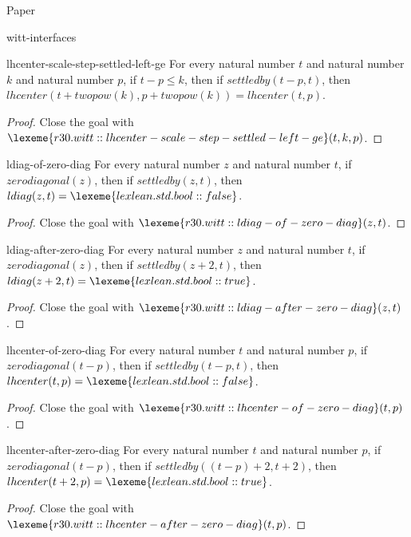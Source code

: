 \begin{lexlean}{Paper}
\begin{section}{witt-interfaces}
  \begin{theorem}{lhcenter-scale-step-settled-left-ge}
  For every natural number \(t\) and natural number \(k\) and natural number \(p\), if \(t - p ≤ k\), then if \(settledby(t - p, t)\), then \(lhcenter(t + twopow(k), p + twopow(k)) = lhcenter(t, p)\).
  \begin{proof}
  Close the goal with \(\lexeme{r30.witt::lhcenter-scale-step-settled-left-ge}(t, k, p)\).
  \end{proof}
  \end{theorem}

  \begin{theorem}{ldiag-of-zero-diag}
  For every natural number \(z\) and natural number \(t\), if \(zerodiagonal(z)\), then if \(settledby(z, t)\), then \(ldiag(z, t) = \lexeme{lexlean.std.bool::false}\).
  \begin{proof}
  Close the goal with \(\lexeme{r30.witt::ldiag-of-zero-diag}(z, t)\).
  \end{proof}
  \end{theorem}

  \begin{theorem}{ldiag-after-zero-diag}
  For every natural number \(z\) and natural number \(t\), if \(zerodiagonal(z)\), then if \(settledby(z + 2, t)\), then \(ldiag(z + 2, t) = \lexeme{lexlean.std.bool::true}\).
  \begin{proof}
  Close the goal with \(\lexeme{r30.witt::ldiag-after-zero-diag}(z, t)\).
  \end{proof}
  \end{theorem}

  \begin{theorem}{lhcenter-of-zero-diag}
  For every natural number \(t\) and natural number \(p\), if \(zerodiagonal(t - p)\), then if \(settledby(t - p, t)\), then \(lhcenter(t, p) = \lexeme{lexlean.std.bool::false}\).
  \begin{proof}
  Close the goal with \(\lexeme{r30.witt::lhcenter-of-zero-diag}(t, p)\).
  \end{proof}
  \end{theorem}

  \begin{theorem}{lhcenter-after-zero-diag}
  For every natural number \(t\) and natural number \(p\), if \(zerodiagonal(t - p)\), then if \(settledby((t - p) + 2, t + 2)\), then \(lhcenter(t + 2, p) = \lexeme{lexlean.std.bool::true}\).
  \begin{proof}
  Close the goal with \(\lexeme{r30.witt::lhcenter-after-zero-diag}(t, p)\).
  \end{proof}
  \end{theorem}


\end{section}
\end{lexlean}
